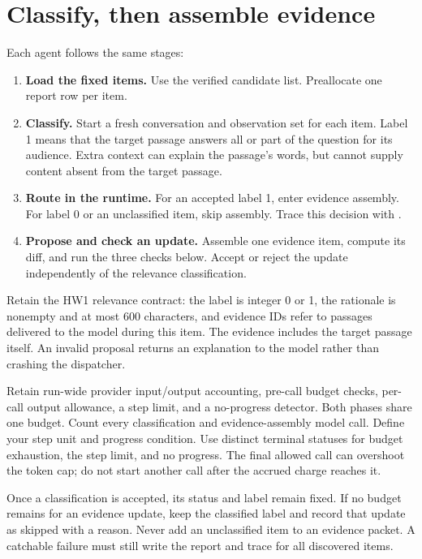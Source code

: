 \documentclass[10pt,letterpaper]{article}
\newcommand{\code}[1]{\texttt{\detokenize{#1}}}
\begin{document}
\section{Classify, then assemble evidence}\label{sec:stages}

Each agent follows the same stages:
\begin{enumerate}
\item \textbf{Load the fixed items.} Use the verified candidate list. Preallocate one report row per item.
\item \textbf{Classify.} Start a fresh conversation and observation set for each item.
  Label 1 means that the target passage answers all or part of the question for its audience.
  Extra context can explain the passage's words, but cannot supply content absent from the target passage.
\item \textbf{Route in the runtime.} For an accepted label 1, enter evidence assembly.
  For label 0 or an unclassified item, skip assembly. Trace this decision with \code{by: runtime}.
\item \textbf{Propose and check an update.} Assemble one evidence item, compute its diff, and run the three checks below.
  Accept or reject the update independently of the relevance classification.
\end{enumerate}

Retain the HW1 relevance contract: the label is integer 0 or 1, the rationale is nonempty and at most 600 characters,
and evidence IDs refer to passages delivered to the model during this item. The evidence includes the target passage itself.
An invalid proposal returns an explanation to the model rather than crashing the dispatcher.

Retain run-wide provider input/output accounting, pre-call budget checks, per-call output allowance, a step limit, and a no-progress detector.
Both phases share one budget. Count every classification and evidence-assembly model call.
Define your step unit and progress condition. Use distinct terminal statuses for budget exhaustion, the step limit, and no progress.
The final allowed call can overshoot the token cap; do not start another call after the accrued charge reaches it.

Once a classification is accepted, its status and label remain fixed.
If no budget remains for an evidence update, keep the classified label and record that update as skipped with a reason.
Never add an unclassified item to an evidence packet. A catchable failure must still write the report and trace for all discovered items.
\end{document}
